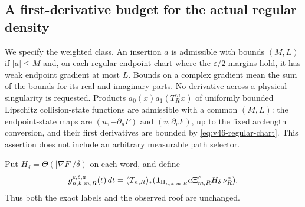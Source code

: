 \subsection{A first-derivative budget for the actual regular density}
We specify the weighted class. An insertion $a$ is admissible with
bounds $(M,L)$ if $|a|\le M$ and, on each regular endpoint chart where
the $\varepsilon/2$-margins hold, it has weak endpoint gradient at most
$L$. Bounds on a complex gradient mean the sum of the bounds for its
real and imaginary parts. No derivative across a physical singularity
is requested. Products $a_0(x)a_1(T_R^m x)$ of uniformly bounded
Lipschitz collision-state functions are admissible with a common
$(M,L)$: the endpoint-state maps are $(u,-\partial_uF)$ and
$(v,\partial_vF)$, up to the fixed arclength conversion, and their
first derivatives are bounded by \eqref{eq:v46-regular-chart}.
This assertion does not include an arbitrary measurable path selector.

Put $H_\delta=\Theta(|\nabla F|/\delta)$ on each word, and define
\begin{equation}\label{eq:v46-regular-source}
 g^{\varepsilon,\delta,a}_{n,k,m,R}(t)\,dt
  =(T_{n,R})_*
       (\one_{\Pi_{n,k,m,R}}a\Xi_{m,R}^{\varepsilon}
                                      H_\delta\,\nu_R^*).
\end{equation}
Thus both the exact labels and the observed roof are unchanged.

